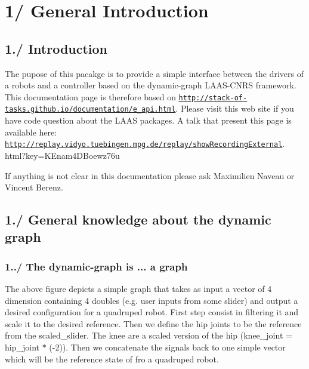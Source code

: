 \hypertarget{index_intro_sec_general_introduction}{}\section{1/ General Introduction}\label{index_intro_sec_general_introduction}
\hypertarget{index_intro_sec_introduction}{}\subsection{1./ Introduction}\label{index_intro_sec_introduction}
The pupose of this pacakge is to provide a simple interface between the drivers of a robots and a controller based on the dynamic-\/graph L\+A\+A\+S-\/\+C\+N\+RS framework. This documentation page is therefore based on \href{http://stack-of-tasks.github.io/documentation/e_api.html}{\tt http\+://stack-\/of-\/tasks.\+github.\+io/documentation/e\+\_\+api.\+html}. Please visit this web site if you have code question about the L\+A\+AS packages. A talk that present this page is available here\+: \href{http://replay.vidyo.tuebingen.mpg.de/replay/showRecordingExternal}{\tt http\+://replay.\+vidyo.\+tuebingen.\+mpg.\+de/replay/show\+Recording\+External}. html?key=K\+Enam4\+D\+Boewz76u

If anything is not clear in this documentation please ask Maximilien Naveau or Vincent Berenz.\hypertarget{index_intro_sec_dg_general_knowledge}{}\subsection{1./ General knowledge about the dynamic graph}\label{index_intro_sec_dg_general_knowledge}
\hypertarget{index_intro_subsec_graph}{}\subsubsection{1../ The dynamic-\/graph is ... a graph}\label{index_intro_subsec_graph}
 The above figure depicts a simple graph that takes as input a vector of 4 dimension containing 4 doubles (e.\+g. user inputs from some slider) and output a desired configuration for a quadruped robot. First step consist in filtering it and scale it to the desired reference. Then we define the hip joints to be the reference from the scaled\+\_\+slider. The knee are a scaled version of the hip (knee\+\_\+joint = hip\+\_\+joint $\ast$ (-\/2)). Then we concatenate the signals back to one simple vector which will be the reference state of fro a quadruped robot.


